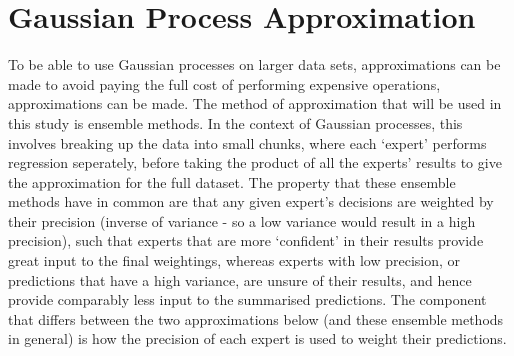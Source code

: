 % 

\section{Gaussian Process Approximation} \label{chapsec:gp-approx}

To be able to use Gaussian processes on larger data sets, approximations can be made to avoid paying the full cost of performing expensive operations, approximations can be made. The method of approximation that will be used in this study is ensemble methods. In the context of Gaussian processes, this involves breaking up the data into small chunks, where each `expert' performs regression seperately, before taking the product of all the experts' results to give the approximation for the full dataset. The property that these ensemble methods have in common are that any given expert's decisions are weighted by their precision (inverse of variance - so a low variance would result in a high precision), such that experts that are more `confident' in their results provide great input to the final weightings, whereas experts with low precision, or predictions that have a high variance, are unsure of their results, and hence provide comparably less input to the summarised predictions. The component that differs between the two approximations below (and these ensemble methods in general) is how the precision of each expert is used to weight their predictions.

